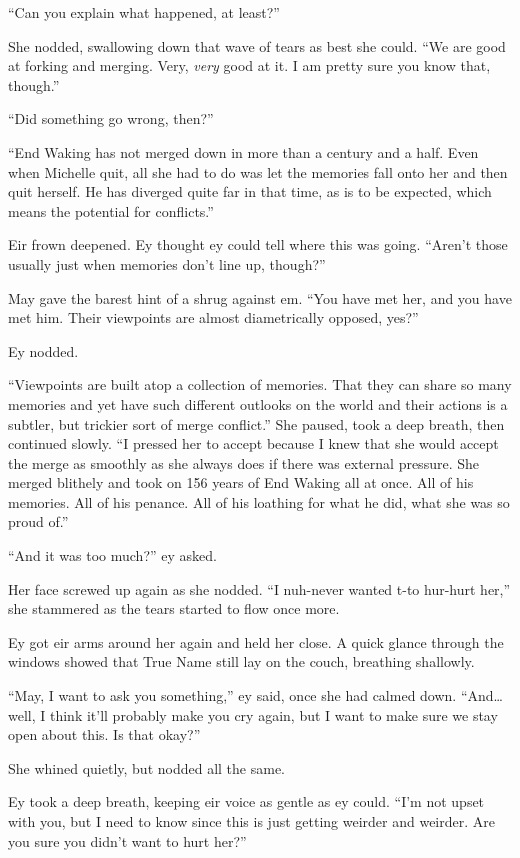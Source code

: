 ``Can you explain what happened, at least?''

She nodded, swallowing down that wave of tears as best she could. ``We are good at forking and merging. Very, \emph{very} good at it. I am pretty sure you know that, though.''

``Did something go wrong, then?''

``End Waking has not merged down in more than a century and a half. Even when Michelle quit, all she had to do was let the memories fall onto her and then quit herself. He has diverged quite far in that time, as is to be expected, which means the potential for conflicts.''

Eir frown deepened. Ey thought ey could tell where this was going. ``Aren't those usually just when memories don't line up, though?''

May gave the barest hint of a shrug against em. ``You have met her, and you have met him. Their viewpoints are almost diametrically opposed, yes?''

Ey nodded.

``Viewpoints are built atop a collection of memories. That they can share so many memories and yet have such different outlooks on the world and their actions is a subtler, but trickier sort of merge conflict.'' She paused, took a deep breath, then continued slowly. ``I pressed her to accept because I knew that she would accept the merge as smoothly as she always does if there was external pressure. She merged blithely and took on 156 years of End Waking all at once. All of his memories. All of his penance. All of his loathing for what he did, what she was so proud of.''

``And it was too much?'' ey asked.

Her face screwed up again as she nodded. ``I nuh-never wanted t-to hur-hurt her,'' she stammered as the tears started to flow once more.

Ey got eir arms around her again and held her close. A quick glance through the windows showed that True Name still lay on the couch, breathing shallowly.

``May, I want to ask you something,'' ey said, once she had calmed down. ``And\ldots well, I think it'll probably make you cry again, but I want to make sure we stay open about this. Is that okay?''

She whined quietly, but nodded all the same.

Ey took a deep breath, keeping eir voice as gentle as ey could. ``I'm not upset with you, but I need to know since this is just getting weirder and weirder. Are you sure you didn't want to hurt her?''

